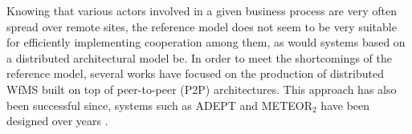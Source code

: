 Knowing that various actors involved in a given business process are very often spread over remote sites, the reference model does not seem to be very suitable for efficiently implementing cooperation among them, as would systems based on a distributed architectural model be.
In order to meet the shortcomings of the reference model, several works \cite{theseKanzow, junYan06, fakas04, theseImine, SON} have focused on the production of distributed WfMS built on top of peer-to-peer (P2P) architectures. This approach has also been successful since, systems such as ADEPT \cite{adept} and METEOR$_{2}$ \cite{meteor} have been designed over years \cite{theseKanzow}.











